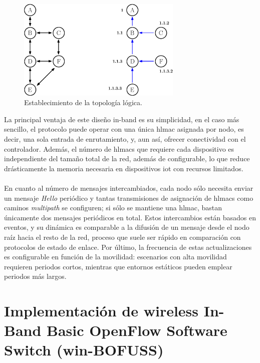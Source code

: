 \begin{figure}[ht!]
     \centering
     \includegraphics[width=0.7\textwidth]{fig/04_in-band/in_band_4.eps}
     \caption{Establecimiento de la topología lógica.}
     \label{fig:in_band_4}
\end{figure}


La principal ventaja de este diseño in-band es su simplicidad, en el caso más sencillo, el protocolo puede operar con una única \gls{hlmac} asignada por nodo, es decir,  una sola entrada de enrutamiento, y, aun así, ofrecer conectividad con el controlador. Además, el número de \glspl{hlmac} que requiere cada dispositivo es independiente del tamaño total de la red, además de configurable, lo que reduce drásticamente la memoria necesaria en dispositivos \gls{iot} con recursos limitados. \\
\\
En cuanto al número de mensajes intercambiados, cada nodo sólo necesita enviar un mensaje \textit{Hello} periódico y tantas transmisiones de asignación de \glspl{hlmac} como caminos \textit{multipath} se configuren; si sólo se mantiene una \gls{hlmac}, bastan únicamente dos mensajes periódicos en total. Estos intercambios están basados en eventos, y su dinámica es comparable a la difusión de un mensaje desde el nodo raíz hacia el resto de la red, proceso que suele ser rápido en comparación con protocolos de estado de enlace. Por último, la frecuencia de estas actualizaciones es configurable en función de la movilidad: escenarios con alta movilidad requieren periodos cortos, mientras que entornos estáticos pueden emplear periodos más largos.

\section{Implementación de wireless In-Band Basic OpenFlow Software Switch (win-BOFUSS)}

